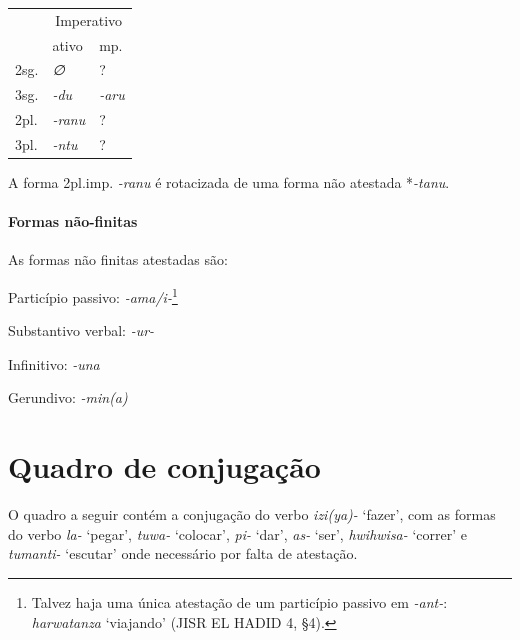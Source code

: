 \begin{center}
	\begin{tabular}[c]{lll}
		\toprule
		     & \multicolumn{2}{c}{Imperativo}               \\
		     & ativo                          & mp.         \\
		\midrule
		2sg. & \emph{∅}                       & {?}         \\
		3sg. & \emph{-du}                     & \emph{-aru} \\
		\midrule
		2pl. & \emph{-ranu}                   & {?}         \\
		3pl. & \emph{-ntu}                    & {?}         \\
		\bottomrule
	\end{tabular}
\end{center}

\noindent A forma 2pl.imp. \emph{-ranu} é rotacizada de uma forma não atestada
*\emph{-tanu}.

\paragraph{Formas não-finitas}
As formas não finitas atestadas são:

\begin{compactitem}
	\item Particípio passivo: \emph{-ama\slash{}i-}\footnote{Talvez haja uma única
		atestação de um particípio passivo em \emph{-ant-}: \emph{harwatanza}
		`viajando' (JISR EL HADID 4, §4).}
	\item Substantivo verbal: \emph{-ur-}
	\item Infinitivo: \emph{-una}
	\item Gerundivo: \emph{-min{(a)}}
\end{compactitem}



\section{Quadro de conjugação}

O quadro a seguir contém a conjugação do verbo \emph{izi{(ya)}-} `fazer', com as
formas do verbo \emph{la-} `pegar', \emph{tuwa-} `colocar', \emph{pi-} `dar',
\emph{as-} `ser', \emph{hwihwisa-}
`correr' e \emph{tumanti-} `escutar' onde necessário por falta de atestação.

